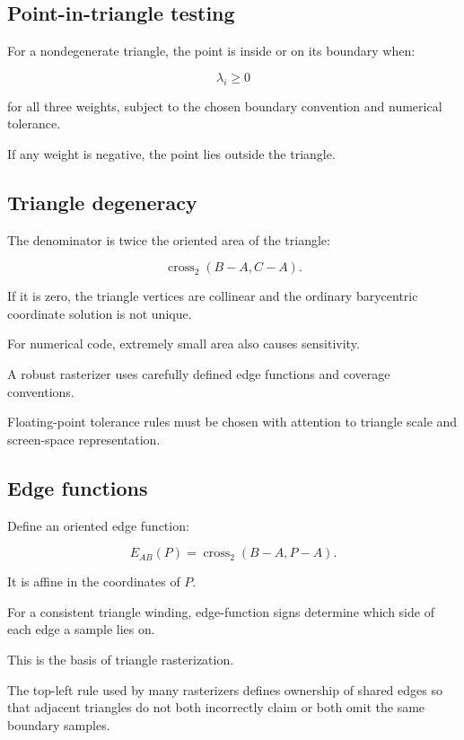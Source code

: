 \subsection{Point-in-triangle testing}\label{02-foundations-ii-ch034-point-in-triangle-testing}

For a nondegenerate triangle, the point is inside or on its boundary when:

\[
 \boxed{ \lambda_i\ge0 }
\]

for all three weights, subject to the chosen boundary convention and numerical tolerance.

If any weight is negative, the point lies outside the triangle.

\subsection{Triangle degeneracy}\label{02-foundations-ii-ch034-triangle-degeneracy}

The denominator is twice the oriented area of the triangle:

\[
 \operatorname{cross}_2(B-A,C-A).
\]

If it is zero, the triangle vertices are collinear and the ordinary barycentric coordinate solution is not unique.

For numerical code, extremely small area also causes sensitivity.

A robust rasterizer uses carefully defined edge functions and coverage conventions.

Floating-point tolerance rules must be chosen with attention to triangle scale and screen-space representation.

\subsection{Edge functions}\label{02-foundations-ii-ch034-edge-functions}

Define an oriented edge function:

\[
 \boxed{ E_{AB}(P)= \operatorname{cross}_2(B-A,P-A) }.
\]

It is affine in the coordinates of \(P\).

For a consistent triangle winding, edge-function signs determine which side of each edge a sample lies on.

This is the basis of triangle rasterization.

The top-left rule used by many rasterizers defines ownership of shared edges so that adjacent triangles do not both incorrectly claim or both omit the same boundary samples.

